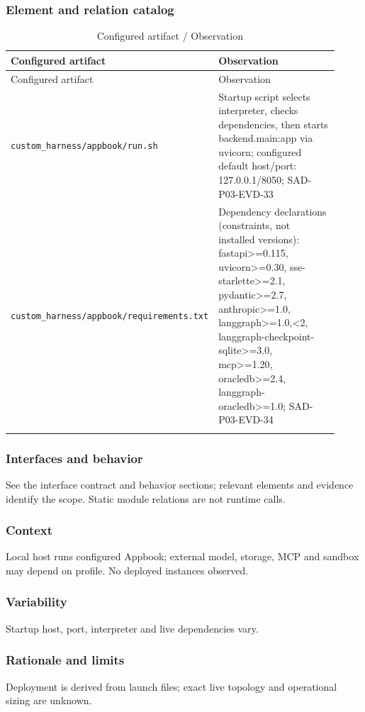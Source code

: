 \documentclass[10pt,letterpaper]{article}
\begin{document}
\subsubsection{Element and relation catalog}
\begin{longtable}{@{}>{\raggedright\arraybackslash}p{0.38\linewidth}>{\raggedright\arraybackslash}p{0.54\linewidth}@{}}
\caption{Configured artifact / Observation}\\
\toprule Configured artifact & Observation\\\midrule\endfirsthead
\toprule Configured artifact & Observation\\\midrule\endhead
\nolinkurl{custom_harness/appbook/run.sh} & Startup script selects interpreter, checks dependencies, then starts backend.main:app via uvicorn; configured default host/port: 127.0.0.1/8050; SAD-P03-EVD-33\\\addlinespace
\nolinkurl{custom_harness/appbook/requirements.txt} & Dependency declarations (constraints, not installed versions): fastapi>=0.115, uvicorn>=0.30, sse-starlette>=2.1, pydantic>=2.7, anthropic>=1.0, langgraph>=1.0,<2, langgraph-checkpoint-sqlite>=3.0, mcp>=1.20, oracledb>=2.4, langgraph-oracledb>=1.0; SAD-P03-EVD-34\\\addlinespace
\bottomrule\end{longtable}

\subsubsection{Interfaces and behavior}
See the interface contract and behavior sections; relevant elements and evidence identify the scope. Static module relations are not runtime calls.
\subsubsection{Context}
Local host runs configured Appbook; external model, storage, MCP and sandbox may depend on profile. No deployed instances observed.
\subsubsection{Variability}
Startup host, port, interpreter and live dependencies vary.
\subsubsection{Rationale and limits}
Deployment is derived from launch files; exact live topology and operational sizing are unknown.
\end{document}
